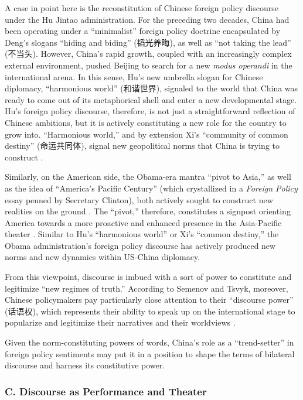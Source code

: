 \documentclass[12pt,letterpaper]{article}
\begin{document}
A case in point here is the reconstitution of Chinese foreign policy discourse under the Hu Jintao administration. For the preceding two decades, China had been operating under a ``minimalist'' foreign policy doctrine encapsulated by Deng's slogans ``hiding and biding'' (韬光养晦), as well as ``not taking the lead'' (不当头). However, China's rapid growth, coupled with an increasingly complex external environment, pushed Beijing to search for a new \emph{modus operandi} in the international arena. In this sense, Hu's new umbrella slogan for Chinese diplomacy, ``harmonious world'' (和谐世界), signaled to the world that China was ready to come out of its metaphorical shell and enter a new developmental stage. Hu's foreign policy discourse, therefore, is not just a straightforward reflection of Chinese ambitions, but it is actively constituting a new role for the country to grow into. ``Harmonious world,'' and by extension Xi's ``community of common destiny'' (命运共同体), signal new geopolitical norms that China is trying to construct \autocite[29--32]{su2009}.

Similarly, on the American side, the Obama-era mantra ``pivot to Asia,'' as well as the idea of ``America's Pacific Century'' (which crystallized in a \emph{Foreign Policy} essay penned by Secretary Clinton), both actively sought to construct new realities on the ground \autocite{clinton2011}. The ``pivot,'' therefore, constitutes a signpost orienting America towards a more proactive and enhanced presence in the Asia-Pacific theater \autocite{davidson2014}. Similar to Hu's ``harmonious world'' or Xi's ``common destiny,'' the Obama administration's foreign policy discourse has actively produced new norms and new dynamics within US-China diplomacy.

From this viewpoint, discourse is imbued with a sort of power to constitute and legitimize ``new regimes of truth.'' According to Semenov and Tsvyk, moreover, Chinese policymakers pay particularly close attention to their ``discourse power'' (话语权), which represents their ability to speak up on the international stage to popularize and legitimize their narratives and their worldviews \autocite[566]{semenov2021}.

Given the norm-constituting powers of words, China's role as a ``trend-setter'' in foreign policy sentiments may put it in a position to shape the terms of bilateral discourse and harness its constitutive power.

\subsubsection*{C. Discourse as Performance and Theater}
\end{document}
